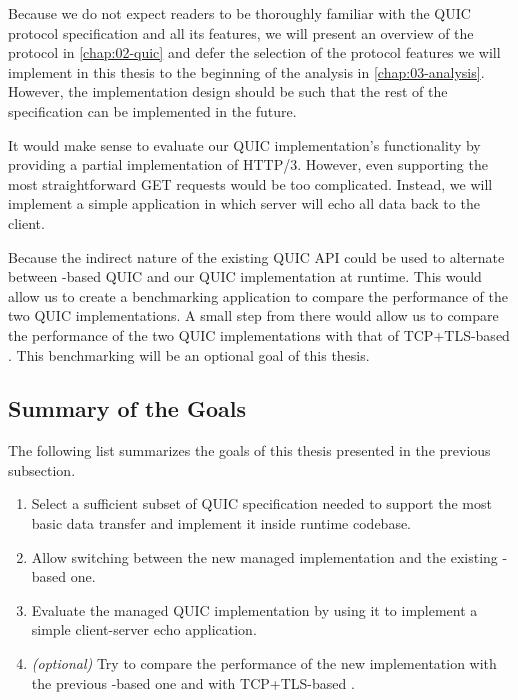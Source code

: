 Because we do not expect readers to be thoroughly familiar with the QUIC protocol specification and
all its features, we will present an overview of the protocol in \autoref{chap:02-quic} and defer
the selection of the protocol features we will implement in this thesis to the beginning of the
analysis in \autoref{chap:03-analysis}. However, the implementation design should be such that the
rest of the specification can be implemented in the future.

It would make sense to evaluate our QUIC implementation's functionality by providing a partial
implementation of HTTP/3. However, even supporting the most straightforward GET requests would be
too complicated. Instead, we will implement a simple application in which server will echo all data
back to the client.

Because the indirect nature of the existing QUIC API could be used to alternate between
\libmsquic{}-based QUIC and our QUIC implementation at runtime. This would allow us to create a
benchmarking application to compare the performance of the two QUIC implementations. A small step
from there would allow us to compare the performance of the two QUIC implementations with that of
TCP+TLS-based . This benchmarking will be an optional goal of this thesis.

\subsection*{Summary of the Goals}

The following list summarizes the goals of this thesis presented in the previous subsection.

\begin{enumerate}

  \item Select a sufficient subset of QUIC specification needed to support the most basic data
  transfer and implement it inside \dotnet{} runtime codebase.

  \item Allow switching between the new managed implementation and the existing \libmsquic{}-based one.

  \item Evaluate the managed QUIC implementation by using it to implement a simple client-server
echo application.

  \item \textit{(optional)} Try to compare the performance of the new implementation with the
previous \libmsquic{}-based one and with TCP+TLS-based .

\end{enumerate}
